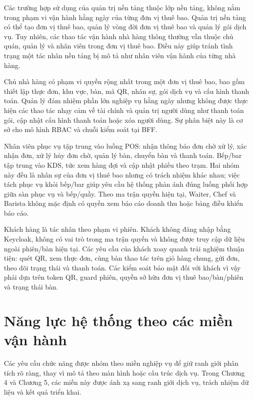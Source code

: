 Các trường hợp sử dụng của quản trị nền tảng thuộc lớp nền tảng, không nằm trong phạm vi vận hành hằng ngày của từng đơn vị thuê bao. Quản trị nền tảng có thể tạo đơn vị thuê bao, quản lý vòng đời đơn vị thuê bao và quản lý gói dịch vụ. Tuy nhiên, các thao tác vận hành nhà hàng thông thường vẫn thuộc chủ quán, quản lý và nhân viên trong đơn vị thuê bao. Điều này giúp tránh tình trạng một tác nhân nền tảng bị mô tả như nhân viên vận hành của từng nhà hàng.

Chủ nhà hàng có phạm vi quyền rộng nhất trong một đơn vị thuê bao, bao gồm thiết lập thực đơn, khu vực, bàn, mã QR, nhân sự, gói dịch vụ và cấu hình thanh toán. Quản lý đảm nhiệm phần lớn nghiệp vụ hằng ngày nhưng không được thực hiện các thao tác nhạy cảm về tài chính và quản trị người dùng như thanh toán gói, cập nhật cấu hình thanh toán hoặc xóa người dùng. Sự phân biệt này là cơ sở cho mô hình RBAC và chuỗi kiểm soát tại BFF.

Nhân viên phục vụ tập trung vào luồng POS: nhận thông báo đơn chờ xử lý, xác nhận đơn, xử lý hủy đơn chờ, quản lý bàn, chuyển bàn và thanh toán. Bếp/bar tập trung vào KDS, tức xem hàng đợi và cập nhật phiếu theo trạm. Hai nhóm này đều là nhân sự của đơn vị thuê bao nhưng có trách nhiệm khác nhau; việc tách phục vụ khỏi bếp/bar giúp yêu cầu hệ thống phản ánh đúng luồng phối hợp giữa sàn phục vụ và bếp/quầy. Theo ma trận quyền hiện tại, Waiter, Chef và Barista không mặc định có quyền xem báo cáo doanh thu hoặc bảng điều khiển báo cáo.

Khách hàng là tác nhân theo phạm vi phiên. Khách không đăng nhập bằng Keycloak, không có vai trò trong ma trận quyền và không được truy cập dữ liệu ngoài phiên/bàn hiện tại. Các yêu cầu của khách xoay quanh trải nghiệm thuận tiện: quét QR, xem thực đơn, cùng bàn thao tác trên giỏ hàng chung, gửi đơn, theo dõi trạng thái và thanh toán. Các kiểm soát bảo mật đối với khách vì vậy phải dựa trên token QR, guard phiên, quyền sở hữu đơn vị thuê bao/bàn/phiên và trạng thái bàn.

\section{Năng lực hệ thống theo các miền vận hành}

Các yêu cầu chức năng được nhóm theo miền nghiệp vụ để giữ ranh giới phân tích rõ ràng, thay vì mô tả theo màn hình hoặc cấu trúc dịch vụ. Trong Chương 4 và Chương 5, các miền này được ánh xạ sang ranh giới dịch vụ, trách nhiệm dữ liệu và kết quả triển khai.

